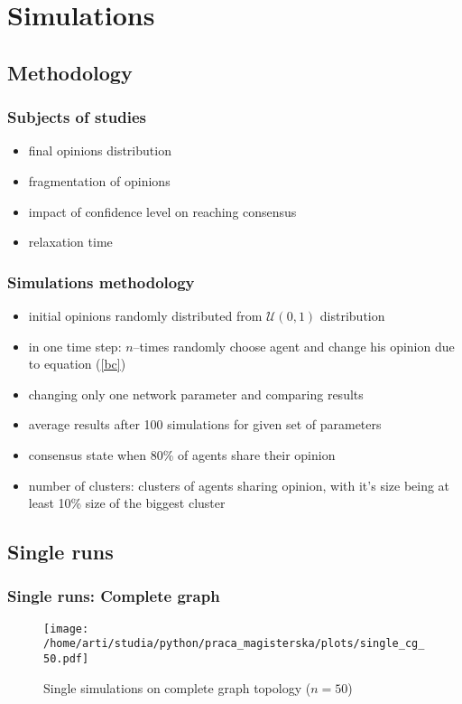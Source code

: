\documentclass[a4paper, 11pt]{beamer}
\begin{document}
\section{Simulations}

\subsection{Methodology}

\begin{frame}
\frametitle{Subjects of studies}
\begin{itemize}
	\item{final opinions distribution}
	\item{fragmentation of opinions}
	\item{impact of confidence level on reaching consensus}
	\item{relaxation time}
\end{itemize}
\end{frame}

\begin{frame}
\frametitle{Simulations methodology}
\begin{itemize}
	\item initial opinions randomly distributed from $\mathcal{U}(0,1)$ distribution
	\item in one time step: $n$--times randomly choose agent and change his opinion due to equation (\ref{bc})
	\item{changing only one network parameter and comparing results}
	\item{average results after 100 simulations for given set of parameters}
	\item{consensus state when 80\% of agents share their opinion}
	\item{number of clusters: clusters of agents sharing opinion, with it's size being at least 10\% size of the biggest cluster}
\end{itemize}
\end{frame}

\subsection{Single runs}

\begin{frame}
\frametitle{Single runs: Complete graph}
\begin{figure}[H]
		\centering
		\texttt{[image: /home/arti/studia/python/praca\_magisterska/plots/single\_cg\_50.pdf]}
		\caption{Single simulations on complete graph topology ($n=50$)}
\end{figure}
\end{frame}
\end{document}
